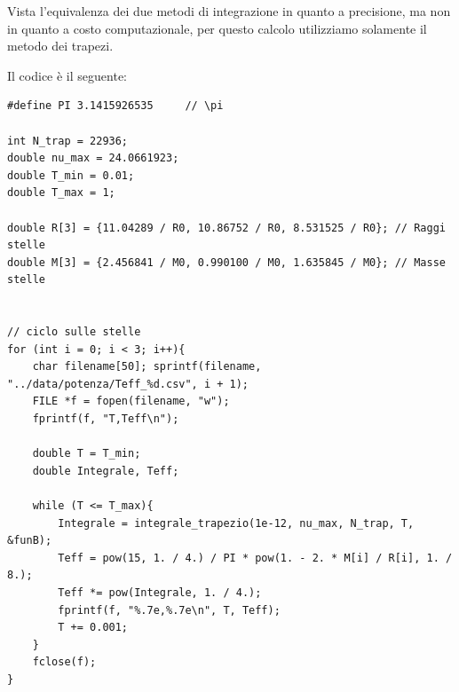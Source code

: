 \documentclass[a4paper, titlepage]{article}
\begin{document}
Vista l'equivalenza dei due metodi di integrazione in quanto a precisione, ma
non in quanto a costo computazionale, per questo calcolo utilizziamo solamente
il metodo dei trapezi.

Il codice è il seguente:

\begin{lstlisting}
#define PI 3.1415926535     // \pi

int N_trap = 22936;
double nu_max = 24.0661923;
double T_min = 0.01;
double T_max = 1;

double R[3] = {11.04289 / R0, 10.86752 / R0, 8.531525 / R0}; // Raggi stelle
double M[3] = {2.456841 / M0, 0.990100 / M0, 1.635845 / M0}; // Masse stelle


// ciclo sulle stelle
for (int i = 0; i < 3; i++){
    char filename[50]; sprintf(filename, "../data/potenza/Teff_%d.csv", i + 1);
    FILE *f = fopen(filename, "w");
    fprintf(f, "T,Teff\n");

    double T = T_min;
    double Integrale, Teff;

    while (T <= T_max){
        Integrale = integrale_trapezio(1e-12, nu_max, N_trap, T, &funB);
        Teff = pow(15, 1. / 4.) / PI * pow(1. - 2. * M[i] / R[i], 1. / 8.);
        Teff *= pow(Integrale, 1. / 4.);
        fprintf(f, "%.7e,%.7e\n", T, Teff);
        T += 0.001;
    }
    fclose(f);
}
\end{lstlisting}
\end{document}
